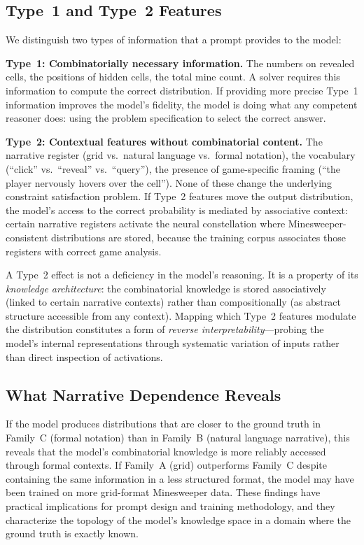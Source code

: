 \documentclass[12pt,a4paper]{article}
\begin{document}
\subsection{Type~1 and Type~2 Features}
\label{sec:type12}

We distinguish two types of information that a prompt provides to the model:

\textbf{Type~1: Combinatorially necessary information.} The numbers on revealed cells, the positions of hidden cells, the total mine count. A solver requires this information to compute the correct distribution. If providing more precise Type~1 information improves the model's fidelity, the model is doing what any competent reasoner does: using the problem specification to select the correct answer.

\textbf{Type~2: Contextual features without combinatorial content.} The narrative register (grid vs.\ natural language vs.\ formal notation), the vocabulary (``click'' vs.\ ``reveal'' vs.\ ``query''), the presence of game-specific framing (``the player nervously hovers over the cell''). None of these change the underlying constraint satisfaction problem. If Type~2 features move the output distribution, the model's access to the correct probability is mediated by associative context: certain narrative registers activate the neural constellation where Minesweeper-consistent distributions are stored, because the training corpus associates those registers with correct game analysis.

A Type~2 effect is not a deficiency in the model's reasoning. It is a property of its \emph{knowledge architecture}: the combinatorial knowledge is stored associatively (linked to certain narrative contexts) rather than compositionally (as abstract structure accessible from any context). Mapping which Type~2 features modulate the distribution constitutes a form of \emph{reverse interpretability}---probing the model's internal representations through systematic variation of inputs rather than direct inspection of activations.

\subsection{What Narrative Dependence Reveals}
\label{sec:narrative_reveals}

If the model produces distributions that are closer to the ground truth in Family~C (formal notation) than in Family~B (natural language narrative), this reveals that the model's combinatorial knowledge is more reliably accessed through formal contexts. If Family~A (grid) outperforms Family~C despite containing the same information in a less structured format, the model may have been trained on more grid-format Minesweeper data. These findings have practical implications for prompt design and training methodology, and they characterize the topology of the model's knowledge space in a domain where the ground truth is exactly known.
\end{document}
